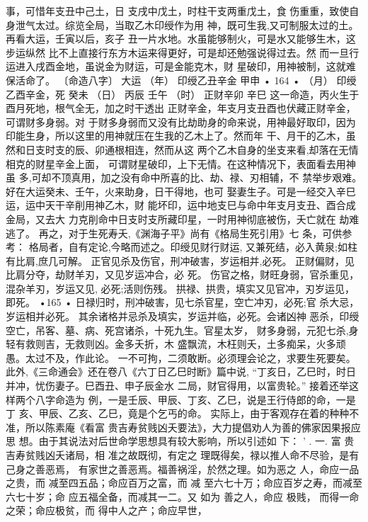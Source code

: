 事，可惜年支丑中己土，日 支戌中戊土，时柱干支两重戊土，食
伤重重，致使自身泄气太过。综览全局，当取乙木印绶作为用
神，既可生我,又可制服太过的土。再看大运，壬寅以后，亥子
丑一片水地。水虽能够制火，可是水又能够生木，这步运纵然
比不上直接行东方木运来得更好，可是却还勉强说得过去。然
而一旦行运进入戌酉金地，虽说金为财运，可是金能克木，财
星破印，用神被制，这就难保活命了。
〔命造八字〕 大运
（年） 印绶乙丑辛金 甲申
• 164 •
（月） 印绶乙酉辛金，死 癸未
（日） 丙辰 壬午
（时） 正财辛卯 辛巳
这一命造，丙火生于酉月死地，根气全无，加之时干透出
正财辛金，年支月支丑酉也伏藏正财辛金，可谓财多身弱。对
于财多身弱而又没有比劫助身的命来说，用神最好取印，因为
印能生身，所以这里的用神就压在生我的乙木上了。然而年
干、月干的乙木，虽然和日支时支的辰、卯通根相连，然而从这
两个乙木自身的坐支来看,却落在无情相克的财星辛金上面，
可谓财星破印，上下无情。在这种情况下，表面看去用神虽
多,可却不顶真用，加之没有命中所喜的比、劫、禄、刃相辅，不
禁举步艰难。好在大运癸未、壬午，火来助身，日干得地，也可
娶妻生子。可是一经交入辛巳运，运中天干辛削用神乙木，财
能坏印，运中地支巳与命中年支月支丑、酉合成金局，又去大
力克削命中日支时支所藏印星，一时用神彻底被伤，夭亡就在
劫难逃了。
再之，对于生死寿夭,《渊海子平》尚有《格局生死引用》七
条，可供参考：
格局者，自有定论,今略而述之。印绶见财行财运,
又兼死结，必入黄泉;如柱有比肩,庶几可解。
正官见杀及伤官，刑冲破害，岁运相并,必死。
正财偏财，见比肩分夺，劫财羊刃，又见岁运冲合，必
死。
伤官之格，财旺身弱，官杀重见，混杂羊刃，岁运又见,
必死;活则伤残。
拱禄、拱贵，填实又见官冲，刃岁运见，即死。
•165 •
日禄归时，刑冲破害，见七杀官星，空亡冲刃，必死;官
杀大忌，岁运相并必死。
其余诸格并忌杀及填实，岁运并临，必死。会诸凶神
恶杀，印绶空亡，吊客、墓、病、死宫诸杀，十死九生。官星太岁，
财多身弱，元犯七杀,身轻有救则吉，无救则凶。金多夭折，木
盛飘流，木枉则夭，土多痴呆，火多顽愚。太过不及，作此论。
一不可拘，二须敢断。必须理会论之，求要生死要矣。
此外,《三命通会》还在卷八《六丁日乙巳时断》篇中说,
“丁亥日，乙巳时，时日并冲，忧伤妻子。巳酉丑、申子辰金水
二局，财官得用，以富贵轮。” 接着还举这样两个八字命造为
例，一是壬辰、甲辰、丁亥、乙巳，说是王行侍郎的命，一是丁
亥、甲辰、乙亥、乙巳，竟是个乞丐的命。
实际上，由于客观存在着的种种不准，所以陈素庵《看富
贵吉寿贫贱凶夭要法》，大力提倡劝人为善的佛家因果报应思
想。由于其说法对后世命学思想具有较大影响，所以引述如
下： ’
.
一. 富 贵吉寿贫贱凶夭诸局，相 准之故既彻，有定之
理既得矣，禄以推人命不尽验，是有己身之善恶焉，
有家世之善恶焉。福善祸淫，於然之理。如为恶之
人，命应一品之贵，而 减至四五品；命应百万之富，而
减 至六七十万；命应百岁之寿，而减至六七十岁；命
应五福全备，而减其一二。又 如为 善之人，命应 极贱，
而得一命之荣；命应极贫，而 得中人之产；命应早世，
